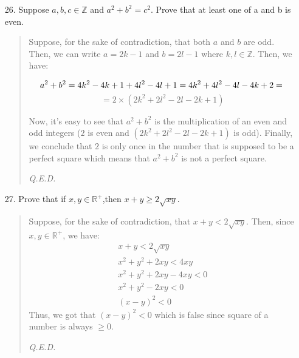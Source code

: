 \documentclass[12pt, a4paper]{article}                      %
\begin{document}
\begin{enumerate}
\item[26.]
Suppose $a, b, c \in \mathbb{Z}$ and $a^2 + b^2 = c^2$.
Prove that at least one of a and b is even.
\begin{quote}
Suppose, for the sake of contradiction, that both $a$ and $b$ are odd.
Then, we can write $a = 2k - 1$ and $b = 2l - 1$ where $k,l \in \mathbb{Z}$.
Then, we have:

$$
a^2 + b^2 = 4k^2 - 4k + 1 + 4l^2 - 4l + 1 = 4k^2 + 4l^2 - 4l - 4k + 2 = \\
$$
$$
= 2 \times (2k^2 + 2l^2 - 2l - 2k + 1)
$$

Now, it's easy to see that $a^2 + b^2$ is the multiplication of an even and odd
integers ($2$ is even and $(2k^2 + 2l^2 - 2l - 2k + 1)$ is odd). Finally, we conclude
that $2$ is only once in the number that is supposed to be a perfect square which means
that $a^2 + b^2$ is not a perfect square.
\begin{flushright}
\textit{Q.E.D.}
\end{flushright}
\end{quote}

\item[27.]
Prove that if $x,y \in \mathbb{R}^+$,then $x + y \geq 2\sqrt{xy}$.
\begin{quote}
Suppose, for the sake of contradiction, that $x + y < 2\sqrt{xy}$.
Then, since $x,y \in \mathbb{R}^+$, we have:
\begin{align}
x + y < 2\sqrt{xy}\\
x^2 + y^2 + 2xy < 4xy\\
x^2 + y^2 + 2xy -4xy < 0\\
x^2 + y^2 - 2xy < 0\\
(x - y)^2 < 0
\end{align}
Thus, we got that $(x-y)^2 < 0$ which is false since square of a number
is always $\geq 0$.
\begin{flushright}
\textit{Q.E.D.}
\end{flushright}
\end{quote}


\end{enumerate}
\end{document}
